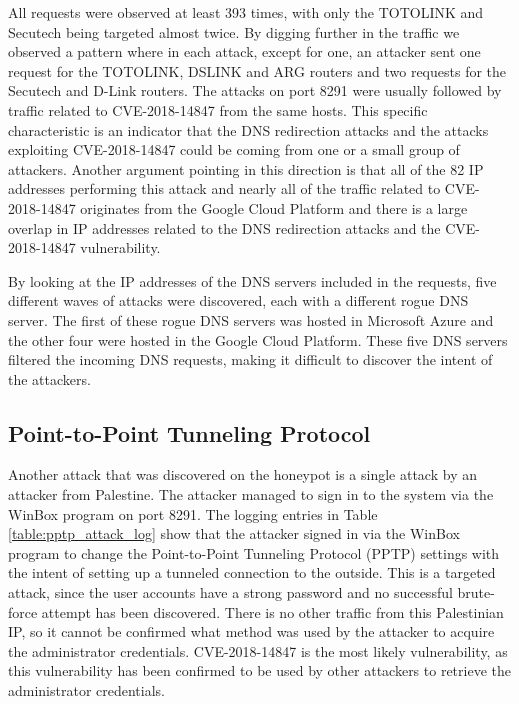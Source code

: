 All requests were observed at least 393 times, with only the TOTOLINK and Secutech being targeted almost twice. By digging further in the traffic we observed a pattern where in each attack, except for one, an attacker sent one request for the TOTOLINK, DSLINK and ARG routers and two requests for the Secutech and D-Link routers. The attacks on port 8291 were usually followed by traffic related to CVE-2018-14847 from the same hosts. This specific characteristic is an indicator that the DNS redirection attacks and the attacks exploiting CVE-2018-14847 could be coming from one or a small group of attackers. Another argument pointing in this direction is that all of the 82 IP addresses performing this attack and nearly all of the traffic related to CVE-2018-14847 originates from the Google Cloud Platform and there is a large overlap in IP addresses related to the DNS redirection attacks and the CVE-2018-14847 vulnerability.

By looking at the IP addresses of the DNS servers included in the requests, five different waves of attacks were discovered, each with a different rogue DNS server. The first of these rogue DNS servers was hosted in Microsoft Azure and the other four were hosted in the Google Cloud Platform. These five DNS servers filtered the incoming DNS requests, making it difficult to discover the intent of the attackers.

\subsection{Point-to-Point Tunneling Protocol}
Another attack that was discovered on the honeypot is a single attack by an attacker from Palestine. The attacker managed to sign in to the system via the WinBox program on port 8291. The logging entries in Table \ref{table:pptp_attack_log} show that the attacker signed in via the WinBox program to change the Point-to-Point Tunneling Protocol (PPTP) settings with the intent of setting up a tunneled connection to the outside. This is a targeted attack, since the user accounts have a strong password and no successful brute-force attempt has been discovered. There is no other traffic from this Palestinian IP, so it cannot be confirmed what method was used by the attacker to acquire the administrator credentials. CVE-2018-14847 is the most likely vulnerability, as this vulnerability has been confirmed to be used by other attackers to retrieve the administrator credentials.

